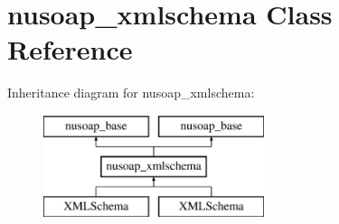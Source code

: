 \hypertarget{classnusoap__xmlschema}{}\section{nusoap\+\_\+xmlschema Class Reference}
\label{classnusoap__xmlschema}
Inheritance diagram for nusoap\+\_\+xmlschema\+:\begin{figure}[H]
\begin{center}
\leavevmode
\includegraphics[height=3.000000cm]{classnusoap__xmlschema}
\end{center}
\end{figure}
